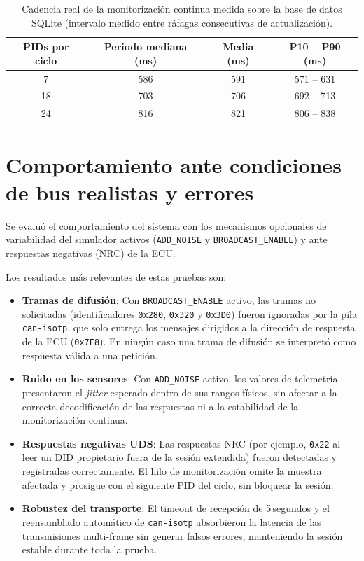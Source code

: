 \begin{table}[H]
\caption{Cadencia real de la monitorización continua medida sobre la base de datos SQLite (intervalo medido entre ráfagas consecutivas de actualización).}
\label{tab:cadencia}
\centering
\renewcommand{\arraystretch}{1.2}
\begin{tabular}{|c|c|c|c|}
\hline
\textbf{PIDs por ciclo} & \textbf{Periodo mediana (ms)} & \textbf{Media (ms)} & \textbf{P10 -- P90 (ms)} \\
\hline
7  & 586 & 591 & 571 -- 631 \\
18 & 703 & 706 & 692 -- 713 \\
24 & 816 & 821 & 806 -- 838 \\
\hline
\end{tabular}
\end{table}

\section{Comportamiento ante condiciones de bus realistas y errores}
\label{sec:resultados_ruido}

Se evaluó el comportamiento del sistema con los mecanismos opcionales de variabilidad del simulador activos (\texttt{ADD\_NOISE} y \texttt{BROADCAST\_ENABLE}) y ante respuestas negativas (NRC) de la ECU.

Los resultados más relevantes de estas pruebas son:

\begin{itemize}
    \item \textbf{Tramas de difusión}: Con \texttt{BROADCAST\_ENABLE} activo, las tramas no solicitadas (identificadores \texttt{0x280}, \texttt{0x320} y \texttt{0x3D0}) fueron ignoradas por la pila \texttt{can-isotp}, que solo entrega los mensajes dirigidos a la dirección de respuesta de la ECU (\texttt{0x7E8}). En ningún caso una trama de difusión se interpretó como respuesta válida a una petición.

    \item \textbf{Ruido en los sensores}: Con \texttt{ADD\_NOISE} activo, los valores de telemetría presentaron el \textit{jitter} esperado dentro de sus rangos físicos, sin afectar a la correcta decodificación de las respuestas ni a la estabilidad de la monitorización continua.

    \item \textbf{Respuestas negativas UDS}: Las respuestas NRC (por ejemplo, \texttt{0x22} al leer un DID propietario fuera de la sesión extendida) fueron detectadas y registradas correctamente. El hilo de monitorización omite la muestra afectada y prosigue con el siguiente PID del ciclo, sin bloquear la sesión.

    \item \textbf{Robustez del transporte}: El timeout de recepción de 5\,segundos y el reensamblado automático de \texttt{can-isotp} absorbieron la latencia de las transmisiones multi-frame sin generar falsos errores, manteniendo la sesión estable durante toda la prueba.
\end{itemize}

